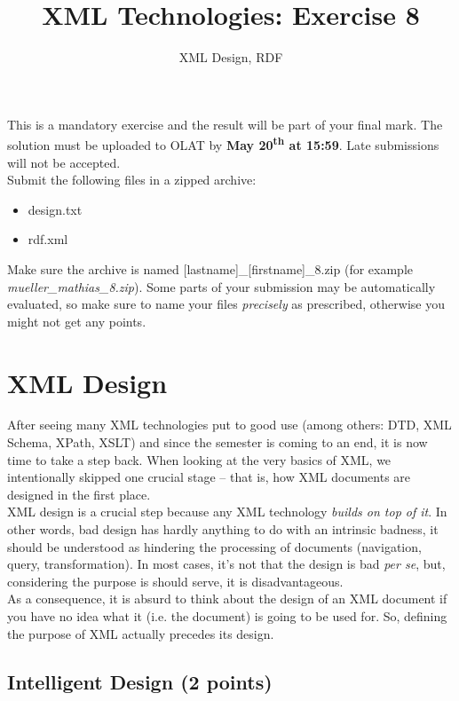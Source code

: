 \documentclass[a4paper, 12pt]{scrartcl}
\title{XML Technologies: Exercise 8}
\date{}
\subtitle{XML Design, RDF}
\begin{document}
\maketitle\vspace{-12ex}

\noindent This is a mandatory exercise and the result will be part of your final mark. The solution must be uploaded to OLAT by \textbf{May 20\textsuperscript{th} at 15:59}. Late submissions will not be accepted.\\


\noindent Submit the following files in a zipped archive:
\begin{itemize}
\item design.txt
\item rdf.xml
\end{itemize}

\noindent Make sure the archive is named [lastname]\_[firstname]\_8.zip (for example \textit{mueller\_mathias\_8.zip}). Some parts of your submission may be automatically evaluated, so make sure to name your files \textit{precisely} as prescribed, otherwise you might not get any points.

\section{XML Design}

After seeing many XML technologies put to good use (among others: DTD, XML Schema, XPath, XSLT) and since the semester is coming to an end, it is now time to take a step back. When looking at the very basics of XML, we intentionally skipped one crucial stage -- that is, how XML documents are designed in the first place.\\


\noindent XML design is a crucial step because any XML technology \textit{builds on top of it}. In other words, bad design has hardly anything to do with an intrinsic badness, it should be understood as hindering the processing of documents (navigation, query, transformation). In most cases, it's not that the design is bad \textit{per se}, but, considering the purpose is should serve, it is disadvantageous. \\

\noindent As a consequence, it is absurd to think about the design of an XML document if you have no idea what it (i.e. the document) is going to be used for. So, defining the purpose of XML actually precedes its design.

\subsection{Intelligent Design (2 points)} 
\end{document}
